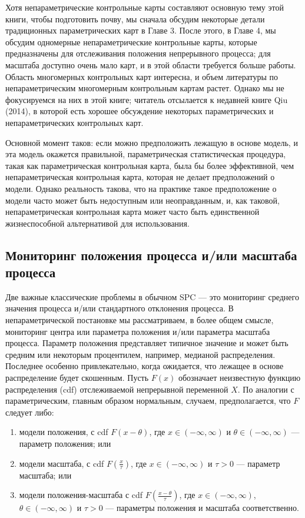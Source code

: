 Хотя непараметрические контрольные карты составляют основную тему этой книги, чтобы подготовить почву, мы сначала обсудим некоторые детали традиционных параметрических карт в Главе 3. После этого, в Главе 4, мы обсудим одномерные непараметрические контрольные карты, которые предназначены для отслеживания положения непрерывного процесса; для масштаба доступно очень мало карт, и в этой области требуется больше работы. Область многомерных контрольных карт интересна, и объем литературы по непараметрическим многомерным контрольным картам растет. Однако мы не фокусируемся на них в этой книге; читатель отсылается к недавней книге Qiu (2014), в которой есть хорошее обсуждение некоторых параметрических и непараметрических контрольных карт.

Основной момент таков: если можно предположить лежащую в основе модель, и эта модель окажется правильной, параметрическая статистическая процедура, такая как параметрическая контрольная карта, была бы более эффективной, чем непараметрическая контрольная карта, которая не делает предположений о модели. Однако реальность такова, что на практике такое предположение о модели часто может быть недоступным или неоправданным, и, как таковой, непараметрическая контрольная карта может часто быть единственной жизнеспособной альтернативой для использования.

\subsection{Мониторинг положения процесса и/или масштаба процесса}
Две важные классические проблемы в обычном SPC — это мониторинг среднего значения процесса и/или стандартного отклонения процесса. В непараметрической постановке мы рассматриваем, в более общем смысле, мониторинг центра или параметра положения и/или параметра масштаба процесса. Параметр положения представляет типичное значение и может быть средним или некоторым процентилем, например, медианой распределения. Последнее особенно привлекательно, когда ожидается, что лежащее в основе распределение будет скошенным. Пусть \(F(x)\) обозначает неизвестную функцию распределения (cdf) отслеживаемой непрерывной переменной \(X\). По аналогии с параметрическим, главным образом нормальным, случаем, предполагается, что \(F\) следует либо:

\begin{enumerate}
	\item модели положения, с cdf \(F(x - \theta)\), где \(x \in (-\infty, \infty)\) и \(\theta \in (-\infty, \infty)\) — параметр положения; или
	\item модели масштаба, с cdf \(F\left(\frac{x}{\tau}\right)\), где \(x \in (-\infty, \infty)\) и \(\tau > 0\) — параметр масштаба; или
	\item модели положения-масштаба с cdf \(F\left(\frac{x - \theta}{\tau}\right)\), где \(x \in (-\infty, \infty)\), \(\theta \in (-\infty, \infty)\) и \(\tau > 0\) — параметры положения и масштаба соответственно.
\end{enumerate}

